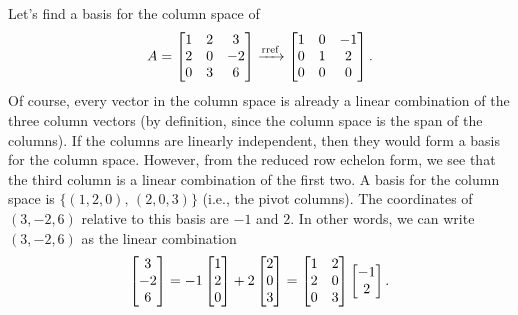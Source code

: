 \begin{example}\label{colspace1ex}
Let's find a basis for the column space of
$$A=\begin{bmatrix}
\begin{matrix} 1\\2\\0 \end{matrix}
&\begin{matrix} 2\\0\\3 \end{matrix}
&\begin{matrix} 3\\-2\\6 \end{matrix}
\end{bmatrix}
\xrightarrow{\operatorname{rref}}
\begin{bmatrix}
\begin{matrix} 1\\0\\0 \end{matrix}
&\begin{matrix} 0\\1\\0 \end{matrix}
&\begin{matrix} -1\\2\\0 \end{matrix}
\end{bmatrix}.
$$
Of course, every vector in the column space is already a linear combination of the three column vectors (by definition, since the column space is the span of the columns).  If the columns are linearly independent, then they would form a basis for the column space.  However, from the reduced row echelon form, we see that the third column is a linear combination of the first two. A basis for the column space is $\{(1,2,0),\,(2,0,3)\}$ (i.e., the pivot columns). 
The coordinates of $(3,-2,6)$ relative to this basis are $-1$ and $2$.  In other words, we can write $(3,-2,6)$ as the linear combination 
 $$\begin{bmatrix}3\\-2\\6\end{bmatrix}
=-1\begin{bmatrix}1\\2\\0\end{bmatrix}+2\begin{bmatrix}2\\0\\3\end{bmatrix} 
=\begin{bmatrix}\begin{matrix} 1\\2\\0 \end{matrix}&\begin{matrix} 2\\0\\3 \end{matrix}\end{bmatrix}\begin{bmatrix}-1\\2\end{bmatrix} .$$ 
\marginpar{
}
\end{example}
